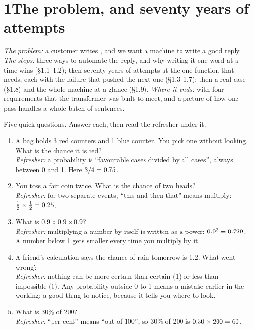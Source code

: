 \newpage
\section*{1\quad The problem, and seventy years of attempts}

\begin{chaptermap}
\emph{The problem:} a customer writes , and we want a machine to write a good reply.
\emph{The steps:} three ways to automate the reply, and why writing it one word at a time wins (\S1.1--1.2);
then seventy years of attempts at the one function that needs, each with the failure that pushed the next
one (\S1.3--1.7); then a real case (\S1.8) and the whole machine at a glance (\S1.9).
\emph{Where it ends:} with four requirements that the transformer was built to meet, and a picture of how
one pass handles a whole batch of sentences.
\end{chaptermap}

\begin{beforeyoustart}
Five quick questions. Answer each, then read the refresher under it.
\begin{enumerate}[label=\arabic*.,leftmargin=1.6em]
\item A bag holds 3 red counters and 1 blue counter. You pick one without looking. What is the chance it is red?\\
\emph{Refresher:} a probability is ``favourable cases divided by all cases'', always between 0 and 1. Here
$3/4 = 0.75$.
\item You toss a fair coin twice. What is the chance of two heads?\\
\emph{Refresher:} for two separate events, ``this and then that'' means multiply: $\tfrac12\times\tfrac12=0.25$.
\item What is $0.9\times0.9\times0.9$?\\
\emph{Refresher:} multiplying a number by itself is written as a power: $0.9^3 = 0.729$. A number below 1
gets smaller every time you multiply by it.
\item A friend's calculation says the chance of rain tomorrow is 1.2. What went wrong?\\
\emph{Refresher:} nothing can be more certain than certain (1) or less than impossible (0). Any probability
outside 0 to 1 means a mistake earlier in the working: a good thing to notice, because it tells you where to look.
\item What is 30\% of 200?\\
\emph{Refresher:} ``per cent'' means ``out of 100'', so 30\% of 200 is $0.30\times200=60$.
\end{enumerate}
\end{beforeyoustart}

